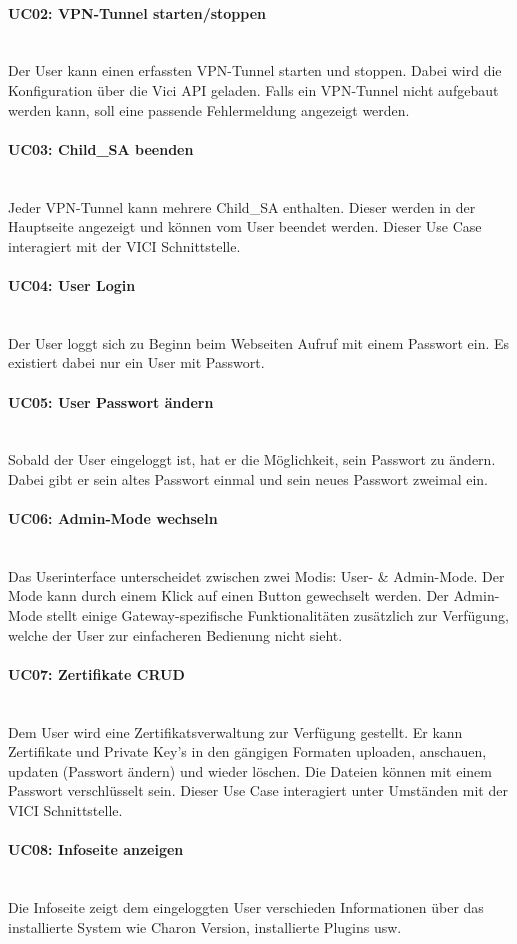 \paragraph{UC02: VPN-Tunnel starten/stoppen}\mbox{} \\
Der User kann einen erfassten VPN-Tunnel starten und stoppen. Dabei wird die Konfiguration über die Vici API geladen. Falls ein VPN-Tunnel nicht aufgebaut werden kann, soll eine passende Fehlermeldung angezeigt werden. 

\paragraph{UC03: Child\_SA beenden}\mbox{} \\
Jeder VPN-Tunnel kann mehrere Child\_SA enthalten. Dieser werden in der Hauptseite angezeigt und können vom User beendet werden. Dieser Use Case interagiert mit der VICI Schnittstelle.

\paragraph{UC04: User Login}\mbox{} \\
Der User loggt sich zu Beginn beim Webseiten Aufruf mit einem Passwort ein. Es existiert dabei nur ein User mit Passwort.

\paragraph{UC05: User Passwort ändern}\mbox{} \\
Sobald der User eingeloggt ist, hat er die Möglichkeit, sein Passwort zu ändern. Dabei gibt er sein altes Passwort einmal und sein neues Passwort zweimal ein.

\paragraph{UC06: Admin-Mode wechseln}\mbox{} \\
Das Userinterface unterscheidet zwischen zwei Modis: User- \& Admin-Mode. Der Mode kann durch einem Klick auf einen Button gewechselt werden. Der Admin-Mode stellt einige Gateway-spezifische Funktionalitäten zusätzlich zur Verfügung, welche der User zur einfacheren Bedienung nicht sieht.

\paragraph{UC07: Zertifikate CRUD}\mbox{} \\
Dem User wird eine Zertifikatsverwaltung zur Verfügung gestellt. Er kann Zertifikate und Private Key's in den gängigen Formaten uploaden, anschauen, updaten (Passwort ändern) und wieder löschen. Die Dateien können mit einem Passwort verschlüsselt sein. Dieser Use Case interagiert unter Umständen mit der VICI Schnittstelle.

\paragraph{UC08: Infoseite anzeigen}\mbox{} \\
Die Infoseite zeigt dem eingeloggten User verschieden Informationen über das installierte System wie Charon Version, installierte Plugins usw.

\newpage





